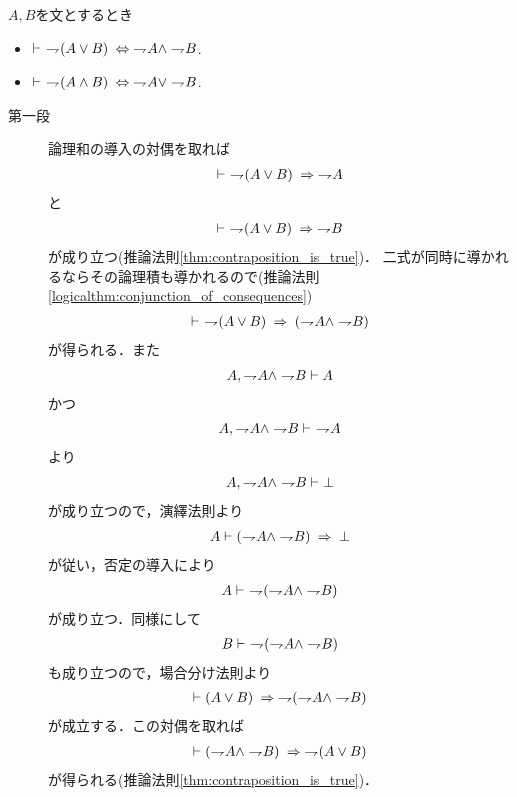 	\begin{screen}
		\begin{logicalthm}[De Morganの法則]
			$A,B$を文とするとき
			\begin{itemize}
				\item $\vdash\ \negation (A \vee B) \lrarrow \negation A \wedge \negation B$.
			
				\item $\vdash\ \negation (A \wedge B) \lrarrow \negation A \vee \negation B$.
			\end{itemize}
		\end{logicalthm}
	\end{screen}
	
	\begin{prf}\mbox{}
		\begin{description}
			\item[第一段]	論理和の導入の対偶を取れば
				\begin{align}
					\vdash\ \negation (A \vee B) \rarrow \negation A
				\end{align}
				と
				\begin{align}
					\vdash\ \negation (A \vee B) \rarrow \negation B
				\end{align}
				が成り立つ(推論法則\ref{thm:contraposition_is_true})．
				二式が同時に導かれるならその論理積も導かれるので(推論法則\ref{logicalthm:conjunction_of_consequences})
				\begin{align}
					\vdash\ \negation (A \vee B) \rarrow (\negation A \wedge \negation B)
				\end{align}
				が得られる．また
				\begin{align}
					A, \negation A \wedge \negation B \vdash A
				\end{align}
				かつ
				\begin{align}
					A, \negation A \wedge \negation B \vdash\ \negation A
				\end{align}
				より
				\begin{align}
					A, \negation A \wedge \negation B \vdash \bot
				\end{align}
				が成り立つので，演繹法則より
				\begin{align}
					A \vdash (\negation A \wedge \negation B) \rarrow \bot
				\end{align}
				が従い，否定の導入により
				\begin{align}
					A \vdash\ \negation (\negation A \wedge \negation B)
				\end{align}
				が成り立つ．同様にして
				\begin{align}
					B \vdash\ \negation (\negation A \wedge \negation B)
				\end{align}
				も成り立つので，場合分け法則より
				\begin{align}
					\vdash (A \vee B) \rarrow \negation (\negation A \wedge \negation B)
				\end{align}
				が成立する．この対偶を取れば
				\begin{align}
					\vdash (\negation A \wedge \negation B) \rarrow \negation (A \vee B)
				\end{align}
				が得られる(推論法則\ref{thm:contraposition_is_true})．
				

\end{description}
\end{prf}
